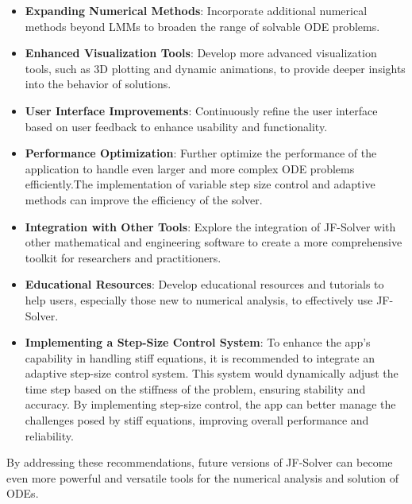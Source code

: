 \begin{itemize}
  \item \textbf{Expanding Numerical Methods}: Incorporate additional numerical methods beyond LMMs to broaden the range of solvable ODE problems.
  \item \textbf{Enhanced Visualization Tools}: Develop more advanced visualization tools, such as 3D plotting and dynamic animations, to provide deeper insights into the behavior of solutions.
  \item \textbf{User Interface Improvements}: Continuously refine the user interface based on user feedback to enhance usability and functionality.
  
  \item \textbf{Performance Optimization}: Further optimize the performance of the application to handle even larger and more complex ODE problems efficiently.The implementation of variable step size control and adaptive methods can improve the efficiency of the solver.
  \item \textbf{Integration with Other Tools}: Explore the integration of JF-Solver with other mathematical and engineering software to create a more comprehensive toolkit for researchers and practitioners.
  \item \textbf{Educational Resources}: Develop educational resources and tutorials to help users, especially those new to numerical analysis, to effectively use JF-Solver.
  \item \textbf{Implementing a Step-Size Control System}: To enhance the app's capability in handling stiff equations, it is recommended to integrate an adaptive step-size control system. This system would dynamically adjust the time step based on the stiffness of the problem, ensuring stability and accuracy. By implementing step-size control, the app can better manage the challenges posed by stiff equations, improving overall performance and reliability.
\end{itemize}

By addressing these recommendations, future versions of JF-Solver can become even more powerful and versatile tools for the numerical analysis and solution of ODEs.
